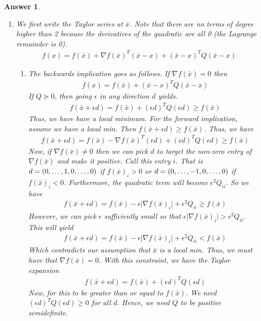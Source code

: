 \documentclass[12pt]{article}
\theoremstyle{colon}
\newtheorem*{answer}{Answer}
\begin{document}
\begin{answer}
\begin{enumerate}[label=\arabic*)]
    \item We first write the Taylor series at $\bar{x}$. Note that there are no terms of degree higher than 2 because the derivatives of the quadratic are all 0 (the Lagrange remainder is 0).
      \begin{gather*}
        f(x) = f(\bar{x}) + \nabla f(\bar{x})^T (\bar{x} - x) + (\bar{x} - x)^T Q (\bar{x} - x)
      \end{gather*}
      \begin{enumerate}[label=\alph*)]
        \item The backwards implication goes as follows. If $\nabla f(\bar{x}) = 0$ then
          \begin{gather*}
            f(x) = f(\bar{x}) + (\bar{x} - x)^T Q (\bar{x} - x)
          \end{gather*}
          If $Q \succeq 0$, then going $\epsilon$ in any direction $d$ yields.
          \begin{gather*}
            f(\bar{x} + \epsilon d) = f(\bar{x}) + (\epsilon d)^T Q (\epsilon d) \geq f(\bar{x})
          \end{gather*}
          Thus, we have have a local minimum. For the forward implication, assume we have a local min. Then $f(\bar{x} + \epsilon d) \geq f(\bar{x})$. Thus, we have
          \begin{gather*}
            f(\bar{x} + \epsilon d) = f(\bar{x}) - \nabla f(\bar{x})^T (\epsilon d) + (\epsilon d)^T Q (\epsilon d) \geq f(\bar{x})
          \end{gather*}
          Now, if $\nabla f(\bar{x}) \neq 0$ then we can pick $d$ to target the non-zero entry of $\nabla f(\bar{x})$ and make it positive. Call this entry $i$. That is $d = (0,\mathellipsis,1,0,\mathellipsis,0)$ if $f(\bar{x})_i > 0$ or $d = (0,\mathellipsis,-1,0,\mathellipsis,0)$ if $f(\bar{x})_i < 0$. Furthermore, the quadratic term will become $\epsilon^2 Q_{ii}$. So we have
          \begin{gather*}
            f(\bar{x} + \epsilon d) = f(\bar{x}) - \epsilon \lvert \nabla f(\bar{x})_i \rvert + \epsilon^2 Q_{ii} \geq f(\bar{x})
          \end{gather*}
          However, we can pick $\epsilon$ sufficiently small so that $\epsilon \lvert \nabla f(\bar{x})_i \rvert > \epsilon^2 Q_{ii}$. This will yield
          \begin{gather*}
            f(\bar{x} + \epsilon d) = f(\bar{x}) - \epsilon \lvert \nabla f(\bar{x})_i \rvert + \epsilon^2 Q_{ii} < f(\bar{x})
          \end{gather*}
          Which contradicts our assumption that $\bar{x}$ is a local min. Thus, we must have that $\nabla f(\bar{x}) = 0$. With this constraint, we have the Taylor expansion
          \begin{gather*}
            f(\bar{x} + \epsilon d) = f(\bar{x}) + (\epsilon d)^T Q (\epsilon d)
          \end{gather*}
          Now, for this to be greater than or equal to $f(\bar{x})$. We need $(\epsilon d)^T Q (\epsilon d) \geq 0$ for all $d$. Hence, we need $Q$ to be positive semidefinite.


\end{enumerate}
\end{enumerate}
\end{answer}
\end{document}
